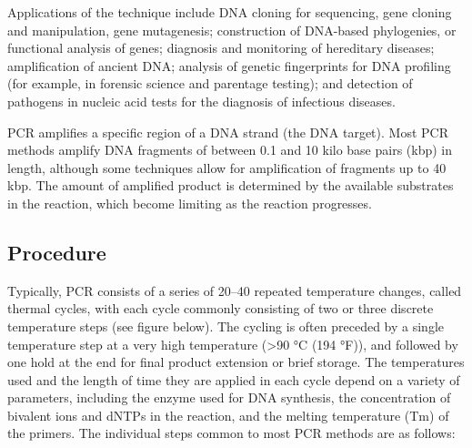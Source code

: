 Applications of the technique include DNA cloning for sequencing, gene cloning and manipulation, gene mutagenesis; construction of DNA-based phylogenies, or functional analysis of genes; diagnosis and monitoring of hereditary diseases; amplification of ancient DNA; analysis of genetic fingerprints for DNA profiling (for example, in forensic science and parentage testing); and detection of pathogens in nucleic acid tests for the diagnosis of infectious diseases.

PCR amplifies a specific region of a DNA strand (the DNA target). Most PCR methods amplify DNA fragments of between 0.1 and 10 kilo base pairs (kbp) in length, although some techniques allow for amplification of fragments up to 40 kbp. The amount of amplified product is determined by the available substrates in the reaction, which become limiting as the reaction progresses.

\hypertarget{procedure}{%
\subsection{Procedure}\label{procedure}}

Typically, PCR consists of a series of 20--40 repeated temperature changes, called thermal cycles, with each cycle commonly consisting of two or three discrete temperature steps (see figure below). The cycling is often preceded by a single temperature step at a very high temperature (\textgreater{}90 °C (194 °F)), and followed by one hold at the end for final product extension or brief storage. The temperatures used and the length of time they are applied in each cycle depend on a variety of parameters, including the enzyme used for DNA synthesis, the concentration of bivalent ions and dNTPs in the reaction, and the melting temperature (Tm) of the primers. The individual steps common to most PCR methods are as follows:

